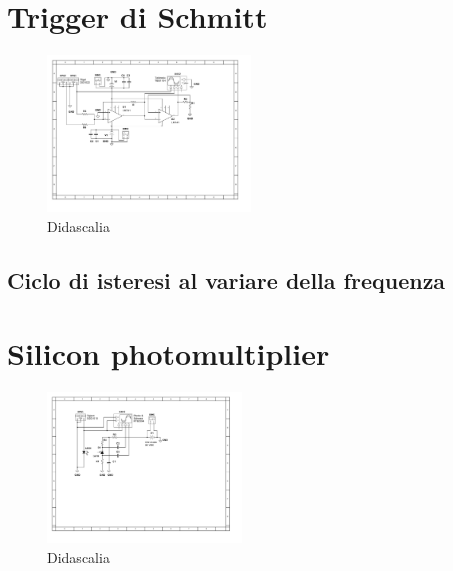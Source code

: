 \documentclass[journal]{IEEEtran}
\begin{document}
\section{Trigger di Schmitt} %

\begin{figure}[H]%
\begin {center}
\includegraphics[width=0.48\textwidth]{sch-simulations/output/OPA-mixer-trigger.pdf}
\caption{Didascalia}
\label{fig:oscilloscope}
\end {center}
\end{figure}

\subsection{Ciclo di isteresi al variare della frequenza} %


\section{Silicon photomultiplier} %

\begin{figure}[H]%
\begin {center}
\includegraphics[width=0.46\textwidth]{sch-simulations/output/SiPM.pdf}
\caption{Didascalia}
\label{fig:oscilloscope}
\end {center}
\end{figure}
\end{document}
